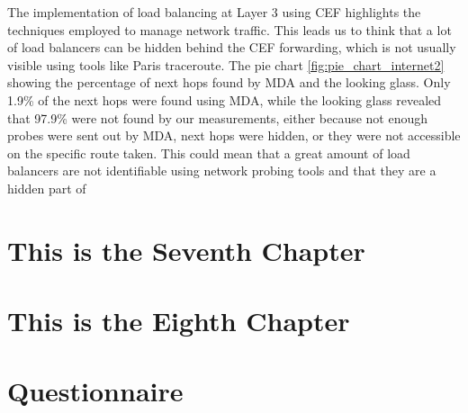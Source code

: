 \documentclass[12pt]{cwru_thesis}
\begin{document}
The implementation of load balancing at Layer 3 using CEF highlights the techniques employed to manage network traffic. This leads us to think that a lot of load balancers can be hidden behind the CEF forwarding, which is not usually visible using tools like Paris traceroute. The pie chart \ref{fig:pie_chart_internet2} showing the percentage of next hops found by MDA and the looking glass. Only 1.9\% of the next hops were found using MDA, while the looking glass revealed that 97.9\% were not found by our measurements, either because not enough probes were sent out by MDA, next hops were hidden, or they were not accessible on the specific route taken.
This could mean that a great amount of load balancers are not identifiable using network probing tools and that they are a hidden part of 

\chapter{}
\chapter{This is the Seventh Chapter}
\chapter{This is the Eighth Chapter}


\appendix

\chapter{Questionnaire}

\printbibliography[heading=bibintoc]
\end{document}
